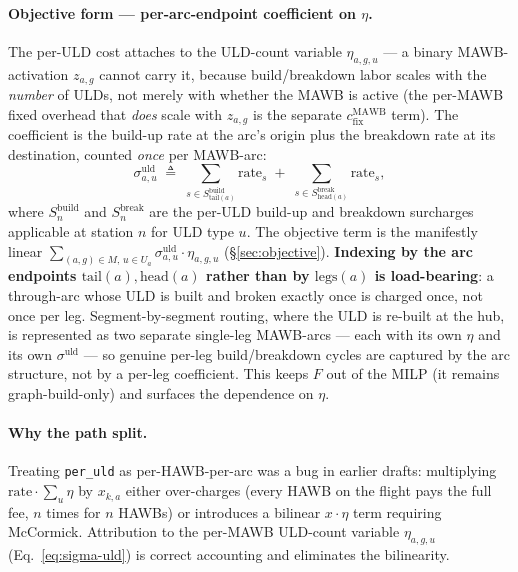 \documentclass[11pt,a4paper]{article}
\newcommand{\defeq}{\triangleq}
\theoremstyle{definition}
\begin{document}
\paragraph{Objective form --- per-arc-endpoint coefficient on $\eta$.}
The per-ULD cost attaches to the ULD-count variable $\eta_{a,g,u}$ --- a
binary MAWB-activation $z_{a,g}$ cannot carry it, because build/breakdown
labor scales with the \emph{number} of ULDs, not merely with whether the
MAWB is active (the per-MAWB fixed overhead that \emph{does} scale with
$z_{a,g}$ is the separate $c^{\text{MAWB}}_{\text{fix}}$ term). The
coefficient is the build-up rate at the arc's origin plus the breakdown
rate at its destination, counted \emph{once} per MAWB-arc:
\begin{equation}
  \sigma^{\text{uld}}_{a,u} \;\defeq\;
    \sum_{s \in S^{\text{build}}_{\text{tail}(a)}} \text{rate}_s
    \;+\;
    \sum_{s \in S^{\text{break}}_{\text{head}(a)}} \text{rate}_s,
  \label{eq:sigma-uld}
\end{equation}
where $S^{\text{build}}_{n}$ and $S^{\text{break}}_{n}$ are the per-ULD
build-up and breakdown surcharges applicable at station $n$ for ULD type
$u$. The objective term is the manifestly linear $\sum_{(a,g) \in M,\,
u \in U_a} \sigma^{\text{uld}}_{a,u} \cdot \eta_{a,g,u}$
(\S\ref{sec:objective}). \textbf{Indexing by the arc endpoints
$\text{tail}(a), \text{head}(a)$ rather than by $\text{legs}(a)$ is
load-bearing}: a through-arc whose ULD is built and broken exactly once is
charged once, not once per leg. Segment-by-segment routing, where the ULD
is re-built at the hub, is represented as two separate single-leg MAWB-arcs
--- each with its own $\eta$ and its own $\sigma^{\text{uld}}$ --- so
genuine per-leg build/breakdown cycles are captured by the arc structure,
not by a per-leg coefficient. This keeps $F$ out of the MILP (it remains
graph-build-only) and surfaces the dependence on $\eta$.

\paragraph{Why the path split.}
Treating \texttt{per\_uld} as per-HAWB-per-arc was a bug in earlier drafts:
multiplying $\text{rate} \cdot \sum_u \eta$ by $x_{k,a}$ either over-charges
(every HAWB on the flight pays the full fee, $n$ times for $n$ HAWBs) or
introduces a bilinear $x \cdot \eta$ term requiring McCormick. Attribution to
the per-MAWB ULD-count variable $\eta_{a,g,u}$ (Eq.~\ref{eq:sigma-uld}) is
correct accounting and eliminates the bilinearity.
\end{document}
